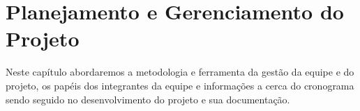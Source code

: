 \chapter{Planejamento e Gerenciamento do Projeto}
Neste capítulo abordaremos a metodologia e ferramenta da gestão da equipe e do projeto, os papéis dos integrantes da equipe e informações a cerca do cronograma sendo seguido no desenvolvimento do projeto e sua documentação.





